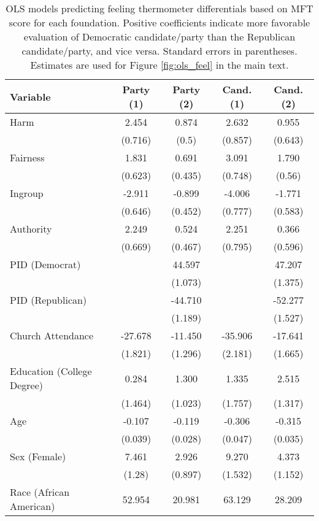 \begin{table}[h]
\centering
\caption{OLS models predicting feeling thermometer differentials based on
           MFT score for each foundation. Positive coefficients indicate more favorable evaluation 
           of Democratic candidate/party than the Republican candidate/party, and vice versa. 
           Standard errors in parentheses. Estimates are used for Figure \ref{fig:ols_feel} 
           in the main text.} 
\label{tab:ols_feel}
\begingroup\footnotesize
\begin{tabular}{lcccc}
  \hline
Variable & Party (1) & Party (2) & Cand. (1) & Cand. (2) \\ 
  \hline
Harm &   2.454 &   0.874 &   2.632 &   0.955 \\ 
   & (0.716) & (0.5) & (0.857) & (0.643) \\ 
  Fairness &   1.831 &   0.691 &   3.091 &   1.790 \\ 
   & (0.623) & (0.435) & (0.748) & (0.56) \\ 
  Ingroup &  -2.911 &  -0.899 &  -4.006 &  -1.771 \\ 
   & (0.646) & (0.452) & (0.777) & (0.583) \\ 
  Authority &   2.249 &   0.524 &   2.251 &   0.366 \\ 
   & (0.669) & (0.467) & (0.795) & (0.596) \\ 
  PID (Democrat) &  &  44.597 &  &  47.207 \\ 
   &  & (1.073) &  & (1.375) \\ 
  PID (Republican) &  & -44.710 &  & -52.277 \\ 
   &  & (1.189) &  & (1.527) \\ 
  Church Attendance & -27.678 & -11.450 & -35.906 & -17.641 \\ 
   & (1.821) & (1.296) & (2.181) & (1.665) \\ 
  Education (College Degree) &   0.284 &   1.300 &   1.335 &   2.515 \\ 
   & (1.464) & (1.023) & (1.757) & (1.317) \\ 
  Age &  -0.107 &  -0.119 &  -0.306 &  -0.315 \\ 
   & (0.039) & (0.028) & (0.047) & (0.035) \\ 
  Sex (Female) &   7.461 &   2.926 &   9.270 &   4.373 \\ 
   & (1.28) & (0.897) & (1.532) & (1.152) \\ 
  Race (African American) &  52.954 &  20.981 &  63.129 &  28.209 \\ 

\end{tabular}
\end{table}
